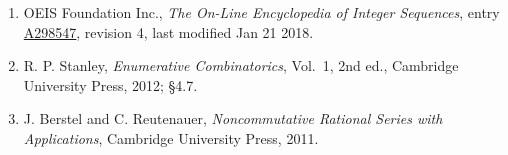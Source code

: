 \documentclass[11pt]{article}
\theoremstyle{definition}
\begin{document}
\begin{enumerate}

\item OEIS Foundation Inc., \emph{The On-Line Encyclopedia of Integer Sequences}, entry \href{https://oeis.org/A298547}{A298547}, revision 4, last modified Jan 21 2018.

\item R. P. Stanley, \emph{Enumerative Combinatorics}, Vol.~1, 2nd ed., Cambridge University Press, 2012; \S4.7.

\item J. Berstel and C. Reutenauer, \emph{Noncommutative Rational Series with Applications}, Cambridge University Press, 2011.

\end{enumerate}
\end{document}
